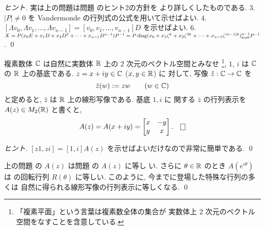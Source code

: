 \documentclass[12pt,twoside]{jarticle}
\begin{document}
\begin{proof}[ヒント]
  実は上の問題は問題  のヒント2の方針を
  より詳しくしたものである. 
  3. $|P|\ne 0$ を Vandermonde の行列式の公式を用いて示せばよい.
  4. $[\Lambda v_0,\Lambda v_1,\ldots,\Lambda v_{n-1}]
  =[v_0,v_1,\ldots,v_{n-1}]D$ を示せばよい.
  6. $X=P(x_0 E+x_1 D+x_2 D^2+\cdots+x_{n-1}D^{n-1})P^{-1} 
  =P\mathop{\mathrm{diag}}\nolimits(x_0+x_1\zeta^k+x_2\zeta^{2k}
  +\cdots+x_{n-1}\zeta^{(n-1)k})_{k=0}^{n-1}P^{-1}$.
  \qed
\end{proof}



\begin{question}[複素数の実行列表示]
  \label{q:hatz}
  複素数体 ${\mathbb C}$ は自然に実数体 ${\mathbb R}$ 上の $2$ 次元のベクトル空間とみなせ%
  \footnote{「複素平面」という言葉は複素数全体の集合が
    実数体上 $2$ 次元のベクトル空間をなすことを含意している.}, %
  $1$, $i$ は ${\mathbb C}$ の ${\mathbb R}$ 上の基底である. $z=x+iy\in{\mathbb C}$ ($x,y\in{\mathbb R}$) に
  対して, 写像 $\hat{z}:{\mathbb C}\to{\mathbb C}$ を
  \begin{equation*}
    \hat{z}(w) := zw \qquad (w\in{\mathbb C})
  \end{equation*}
  と定めると, $\hat{z}$ は ${\mathbb R}$ 上の線形写像である.  基底 $1,i$ に
  関する $\hat{z}$ の行列表示を $A(z)\in M_2({\mathbb R})$ と書くと,
  \begin{equation*}
    A(z) = A(x+iy) =
    \begin{bmatrix}
      x & -y \\
      y & x \\
    \end{bmatrix}.
    \qed
  \end{equation*}
\end{question}

\begin{proof}[ヒント]
  $[z1,zi]=[1,i]A(z)$ を示せばよいだけなので非常に簡単である.
  \qed
\end{proof}

\begin{rem}
  上の問題  の $A(z)$ は問題  の $A(z)$ に等し
  い.  さらに $\theta\in{\mathbb R}$ のとき $A(e^{i\theta})$ は
  の回転行列 $R(\theta)$ に等しい.
  このように, 今までに登場した特殊な行列の多くは
  自然に得られる線形写像の行列表示に等しくなる.
  \qed
\end{rem}

\end{document}
